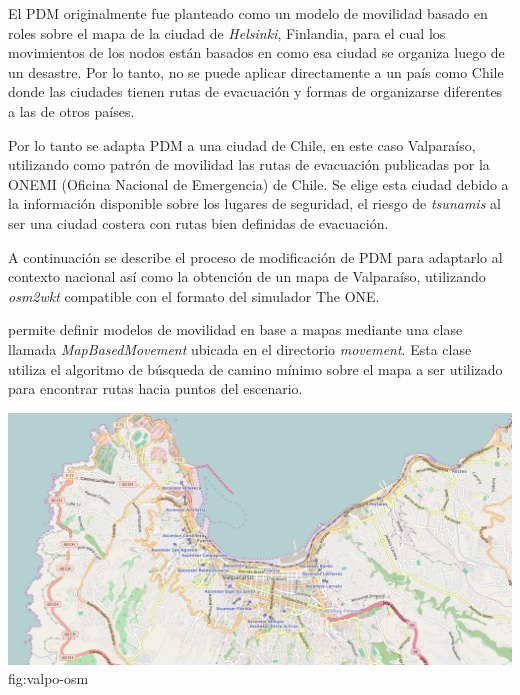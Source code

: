 El PDM \cite{uddin_post-disaster_2009} originalmente fue planteado como un
modelo de movilidad basado en roles sobre el mapa de la ciudad de
\textit{Helsinki}, Finlandia, para el cual los movimientos de los nodos están
basados en como esa ciudad se organiza luego de un desastre. Por lo tanto, no se
puede aplicar directamente a un país como Chile donde las ciudades tienen rutas
de evacuación y formas de organizarse diferentes a las de otros países.

Por lo tanto se adapta PDM a una ciudad de Chile, en este caso
Valparaíso, utilizando como patrón de movilidad las rutas de evacuación
publicadas por la ONEMI (Oficina Nacional de Emergencia) \cite{evacuacion_valpo}
de Chile. Se elige esta ciudad debido a la información disponible sobre
los lugares de seguridad, el riesgo de \textit{tsunamis} al ser una ciudad
costera con rutas bien definidas de evacuación.

A continuación se describe el proceso de modificación de PDM para adaptarlo al
contexto nacional así como la obtención de un mapa de Valparaíso, utilizando
\textit{osm2wkt} \cite{osm2wkt} compatible con el formato del simulador The ONE.



\theone{} \cite{keranen_one_2009} permite definir modelos de movilidad en base a
mapas mediante una clase llamada \textit{MapBasedMovement} ubicada en el
directorio \textit{movement}.  Esta clase utiliza el algoritmo de búsqueda de
camino mínimo sobre el mapa a ser utilizado para encontrar rutas hacia puntos
del escenario.

{\includegraphics[scale=0.4]{imagenes/valpo/valpo.png}}{fig:valpo-osm}

